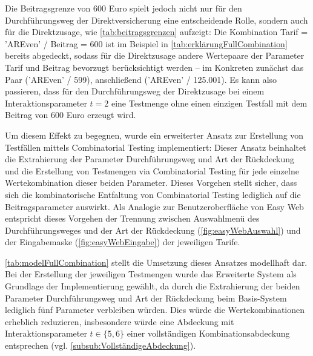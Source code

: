 Die Beitragsgrenze von 600 Euro spielt jedoch nicht nur für den Durchführungsweg der Direktversicherung eine entscheidende Rolle, sondern auch für die Direktzusage, wie \autoref{tab:beitragsgrenzen} aufzeigt: Die Kombination Tarif = 'AREven' / Beitrag = 600 ist im Beispiel in  \autoref{tab:erklärungFullCombination} bereits abgedeckt, sodass für die Direktzusage andere Wertepaare der Parameter Tarif und Beitrag bevorzugt berücksichtigt werden -- im Konkreten zunächst das Paar ('AREven' / 599), anschließend ('AREven' / 125.001). Es kann also passieren, dass für den Durchführungsweg der Direktzusage bei einem Interaktionsparameter $t=2$ eine Testmenge ohne einen einzigen Testfall mit dem Beitrag von 600 Euro erzeugt wird.

Um diesem Effekt zu begegnen, wurde ein erweiterter Ansatz zur Erstellung von Testfällen mittels Combinatorial Testing implementiert: Dieser Ansatz beinhaltet die Extrahierung der Parameter Durchführungsweg und Art der Rückdeckung und die Erstellung von Testmengen via Combinatorial Testing für jede einzelne Wertekombination dieser beiden Parameter. Dieses Vorgehen stellt sicher, dass sich die kombinatorische Entfaltung von Combinatorial Testing lediglich auf die Beitragsparameter auswirkt. Als Analogie zur Benutzeroberfläche von Easy Web entspricht dieses Vorgehen der Trennung zwischen Auswahlmenü des Durchführungsweges und der Art der Rückdeckung (\autoref{fig:easyWebAuswahl}) und der Eingabemaske (\autoref{fig:easyWebEingabe}) der jeweiligen Tarife. 

\autoref{tab:modelFullCombination} stellt die Umsetzung dieses Ansatzes modellhaft dar. Bei der Erstellung der jeweiligen Testmengen wurde das Erweiterte System als Grundlage der Implementierung gewählt, da durch die Extrahierung der beiden Parameter Durchführungsweg und Art der Rückdeckung beim Basis-System lediglich fünf Parameter verbleiben würden. Dies würde die Wertekombinationen erheblich reduzieren, insbesondere würde eine Abdeckung mit Interaktionsparameter $t \in \{5,6\}$ einer vollständigen Kombinationsabdeckung entsprechen (vgl. \autoref{subsub:VollständigeAbdeckung}).

